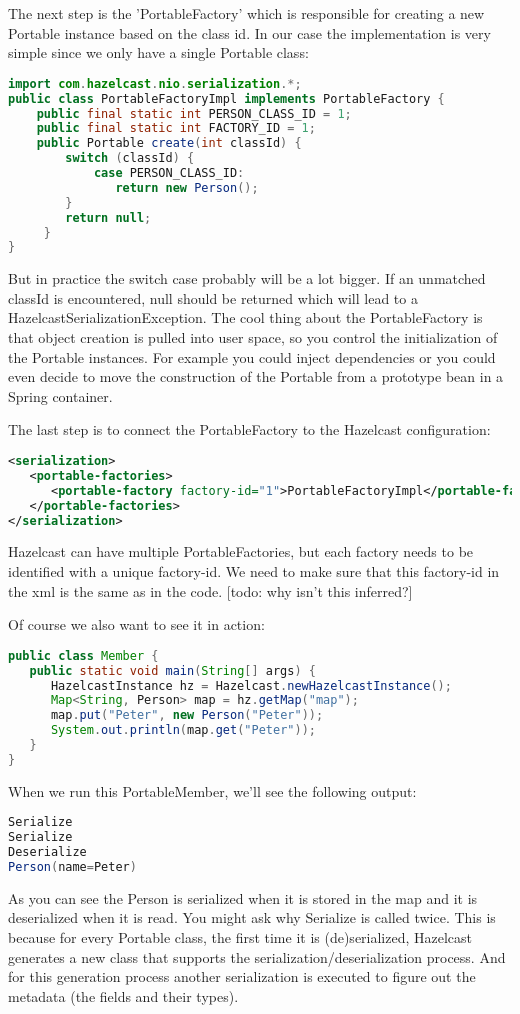 The next step is the 'PortableFactory' which is responsible for creating a new Portable instance based on the class id. In our case the implementation is very simple since we only have a single Portable class:
\begin{lstlisting}[language=java]
import com.hazelcast.nio.serialization.*;
public class PortableFactoryImpl implements PortableFactory {
    public final static int PERSON_CLASS_ID = 1;
    public final static int FACTORY_ID = 1;
    public Portable create(int classId) {
        switch (classId) {
            case PERSON_CLASS_ID: 
               return new Person();
        }
        return null;
     }
}
\end{lstlisting}
But in practice the switch case probably will be a lot bigger. If an unmatched classId is encountered, null should be returned which will lead to a HazelcastSerializationException. The cool thing about the PortableFactory is that object creation is pulled into user space, so you control the initialization of the Portable instances. For example you could inject dependencies or you could even decide to move the construction of the Portable from a prototype bean in a Spring container. 

The last step is to connect the PortableFactory to the Hazelcast configuration:
\begin{lstlisting}[language=xml]
<serialization>
   <portable-factories>
      <portable-factory factory-id="1">PortableFactoryImpl</portable-factory>
   </portable-factories>
</serialization>
\end{lstlisting}
Hazelcast can have multiple PortableFactories, but each factory needs to be identified with a unique factory-id. We need to make sure that this factory-id in the xml is the same as in the code. [todo: why isn't this inferred?]

Of course we also want to see it in action:
\begin{lstlisting}[language=java]
public class Member {
   public static void main(String[] args) {
      HazelcastInstance hz = Hazelcast.newHazelcastInstance();
      Map<String, Person> map = hz.getMap("map");
      map.put("Peter", new Person("Peter"));
      System.out.println(map.get("Peter"));
   }
}
\end{lstlisting}
When we run this PortableMember, we'll see the following output:
\begin{lstlisting}[language=java]
Serialize
Serialize
Deserialize
Person(name=Peter)
\end{lstlisting}
As you can see the Person is serialized when it is stored in the map and it is deserialized when it is read. You might ask why Serialize is called twice. This is because for every Portable class, the first time it is (de)serialized, Hazelcast generates a new class that supports the serialization/deserialization process. And for this generation process another serialization is executed to figure out the metadata (the fields and their types).

